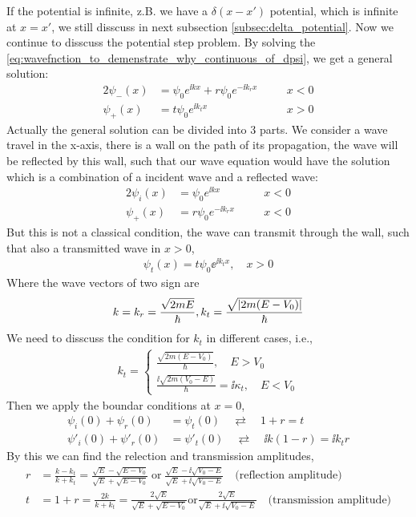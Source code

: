 If the potential is infinite, z.B. we have a $\delta(x-x')$ potential, which is infinite at $x=x'$, we still disscuss in next subsection \cref{subsec:delta_potential}. Now we continue to disscuss the potential step problem. By solving the \cref{eq:wavefnction_to_demenstrate_why_continuous_of_dpsi}, we get a general solution: 
\begin{alignat}{2}
    \psi_{-}(x) &= \psi_0e^{\ii k x} + r \psi_0 e^{-\ii k_{r} x} \quad && x < 0\label{eq:psi_minus} \\
    \psi_{+}(x) &= t \psi_0 e^{\ii k_{t} x} \quad && x > 0 \label{eq:psi_plus}
\end{alignat}
Actually the general solution can be divided into 3 parts. We consider a wave travel in the x-axis, there is a wall on the path of its propagation, the wave will be reflected by this wall, such that our wave equation would have the solution which is a combination of a incident wave and a reflected wave: 
\begin{alignat}{2}
    \psi_{i}(x) &= \psi_0e^{\ii k x}  \quad && x < 0\label{eq:incident_wave_step} \\
    \psi_{+}(x) &= r\psi_0 e^{-\ii k_{r} x} \quad && x < 0 \label{eq:reflected_wave_step}
\end{alignat}
But this is not a classical condition, the wave can transmit through the wall, such that also a transmitted wave in $x>0$,
\begin{eqnarray}
    \psi_t(x) = t \psi_0 \ee^{\ii k_tx },\quad x>0
\end{eqnarray}
Where the wave vectors of two sign are
\begin{eqnarray}
    k = k_r = \frac{\sqrt{2mE}}{\hbar}, k_t = \frac{\sqrt{\left| 2m(E-V_0) \right|}}{\hbar}
\end{eqnarray}
We need to disscuss the condition for $k_t$ in different cases, i.e., 
\begin{align}
    k_t = \begin{cases}
        \frac{\sqrt{2m (E-V_0)}}{\hbar}, \quad E>V_0\\
        \frac{\ii \sqrt{2m(V_0-E)}}{\hbar} = \ii \kappa_t, \quad E<V_0
    \end{cases} \label{eq:transmission_wave_vector}
\end{align}
Then we apply the boundar conditions at $x=0$, 
\begin{align}
    \psi_i(0) + \psi_r(0) &= \psi_t(0)\quad \rightleftarrows \quad 1 + r = t\\
    \psi'_i(0) + \psi'_r(0) &= \psi'_t(0)\quad \rightleftarrows \quad \ii k(1-r) = \ii k_t r 
\end{align}
By this we can find the relection and transmission amplitudes,
\begin{align}
    r &= \frac{k - k_t}{k + k_t} =  \frac{\sqrt{E} - \sqrt{E - V_0}}{\sqrt{E} + \sqrt{E - V_0}}\; \text{or}\; \frac{\sqrt{E} - \ii \sqrt{V_0 - E}}{\sqrt{E} +\ii \sqrt{V_0 - E}} \quad \text{(reflection amplitude)} \label{eq:reflection_amplitude} \\
    t &= 1 + r = \frac{2k}{k + k_t} = \frac{2 \sqrt{E}}{\sqrt{E} + \sqrt{E - V_0}} \text{or} \frac{2 \sqrt{E}}{\sqrt{E} +\ii \sqrt{V_0 - E}}\quad \text{(transmission amplitude)} \label{eq:transmission_amplitude}
\end{align}

